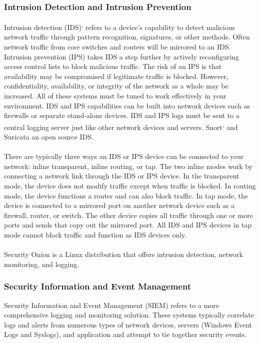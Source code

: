 \subsubsection{Intrusion Detection and Intrusion Prevention}
Intrusion detection (IDS)\textsuperscript{,} refers to a device's capability to detect malicious network traffic through pattern recognition, signatures, or other methods. Often network traffic from core switches and routers will be mirrored to an IDS. Intrusion prevention (IPS) takes IDS a step further by actively reconfiguring access control lists to block malicious traffic. The risk of an IPS is that availability may be compromised if legitimate traffic is blocked. However, confidentiality, availability, or integrity of the network as a whole may be increased. All of these systems must be tuned to work effectively in your environment. IDS and IPS capabilities can be built into network devices such as firewalls or separate stand-alone devices. IDS and IPS logs must be sent to a central logging server just like other network devices and servers. Snort\textsuperscript{,} and Suricata an open source IDS.\\\\
There are typically three ways an IDS or IPS device can be connected to your network: inline transparent, inline routing, or tap. The two inline modes work by connecting a network link through the IDS or IPS device. In the transparent mode, the device does not modify traffic except when traffic is blocked. In routing mode, the device functions a router and can also block traffic. In tap mode, the device is connected to a mirrored port on another network device such as a firewall, router, or switch. The other device copies all traffic through one or more ports and sends that copy out the mirrored port. All IDS and IPS devices in tap mode cannot block traffic and function as IDS devices only.\\\\
Security Onion is a Linux distribution that offers intrusion detection, network monitoring, and logging.
\subsubsection{Security Information and Event Management}
Security Information and Event Management (SIEM) refers to a more comprehensive logging and monitoring solution. These systems typically correlate logs and alerts from numerous types of network devices, servers (Windows Event Logs and Syslogs), and application and attempt to tie together security events.
